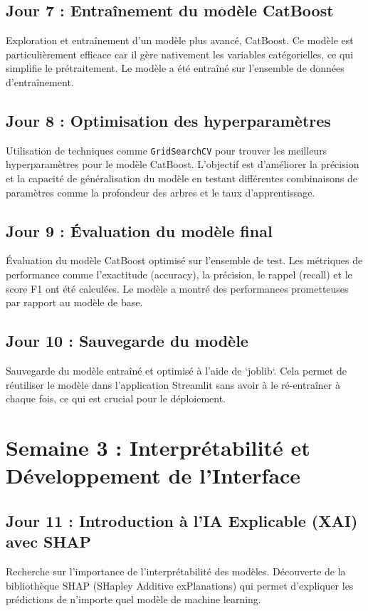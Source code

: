 \documentclass[11pt, a4paper]{report}
\begin{document}
\section{Jour 7 : Entraînement du modèle CatBoost}
Exploration et entraînement d'un modèle plus avancé, CatBoost. Ce modèle est particulièrement efficace car il gère nativement les variables catégorielles, ce qui simplifie le prétraitement. Le modèle a été entraîné sur l'ensemble de données d'entraînement.

\section{Jour 8 : Optimisation des hyperparamètres}
Utilisation de techniques comme \texttt{GridSearchCV} pour trouver les meilleurs hyperparamètres pour le modèle CatBoost. L'objectif est d'améliorer la précision et la capacité de généralisation du modèle en testant différentes combinaisons de paramètres comme la profondeur des arbres et le taux d'apprentissage.

\section{Jour 9 : Évaluation du modèle final}
Évaluation du modèle CatBoost optimisé sur l'ensemble de test. Les métriques de performance comme l'exactitude (accuracy), la précision, le rappel (recall) et le score F1 ont été calculées. Le modèle a montré des performances prometteuses par rapport au modèle de base.

\section{Jour 10 : Sauvegarde du modèle}
Sauvegarde du modèle entraîné et optimisé à l'aide de `joblib`. Cela permet de réutiliser le modèle dans l'application Streamlit sans avoir à le ré-entraîner à chaque fois, ce qui est crucial pour le déploiement.

\chapter{Semaine 3 : Interprétabilité et Développement de l'Interface}
\section{Jour 11 : Introduction à l'IA Explicable (XAI) avec SHAP}
Recherche sur l'importance de l'interprétabilité des modèles. Découverte de la bibliothèque SHAP (SHapley Additive exPlanations) qui permet d'expliquer les prédictions de n'importe quel modèle de machine learning.
\end{document}
